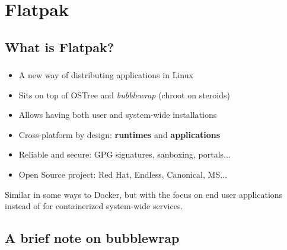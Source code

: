 %
%
%

\section{Flatpak}
\subsection{What is Flatpak?}

\begin{frame}
  \frametitle{\insertsubsection}

    \begin{itemize}
    \item A new way of distributing applications in Linux\vspacing
    \item Sits on top of OSTree and \textit{bubblewrap} (chroot on steroids)\vspacing
    \item Allows having both user and system-wide installations\vspacing
    \item Cross-platform by design: \textbf{runtimes} and \textbf{applications}\vspacing
    \item Reliable and secure: GPG signatures, sanboxing, portals...\vspacing
    \item Open Source project: Red Hat, Endless, Canonical, MS...
    \end{itemize}

    \begin{flushleft}
      Similar in some ways to Docker, but with the focus on end user
      applications instead of for containerized system-wide services.
    \end{flushleft}
\end{frame}

\subsection{A brief note on bubblewrap}

